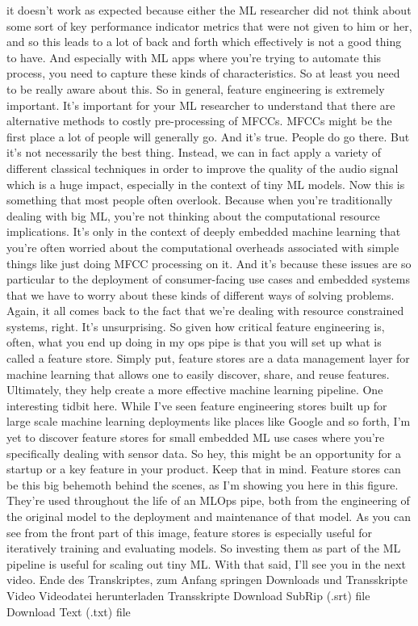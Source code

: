     it doesn't work as expected because either the ML researcher did not
    think about some sort of key performance indicator metrics
    that were not given to him or her, and so this
    leads to a lot of back and forth which effectively is not a good thing
    to have.
    And especially with ML apps where you're trying to automate this process,
    you need to capture these kinds of characteristics.
    So at least you need to be really aware about this.
    So in general, feature engineering is extremely important.
    It's important for your ML researcher to understand
    that there are alternative methods to costly pre-processing of MFCCs.
    MFCCs might be the first place a lot of people will generally go.
    And it's true.
    People do go there.
    But it's not necessarily the best thing.
    Instead, we can in fact apply a variety of different classical techniques
    in order to improve the quality of the audio signal which
    is a huge impact, especially in the context of tiny ML models.
    Now this is something that most people often overlook.
    Because when you're traditionally dealing with big ML,
    you're not thinking about the computational resource implications.
    It's only in the context of deeply embedded machine
    learning that you're often worried about the computational overheads associated
    with simple things like just doing MFCC processing on it.
    And it's because these issues are so particular to the deployment
    of consumer-facing use cases and embedded systems
    that we have to worry about these kinds of different ways of solving problems.
    Again, it all comes back to the fact that we're
    dealing with resource constrained systems, right.
    It's unsurprising.
    So given how critical feature engineering is, often, what you end up
    doing in my ops pipe is that you will set up what is called a feature store.
    Simply put, feature stores are a data management layer for machine learning
    that allows one to easily discover, share, and reuse features.
    Ultimately, they help create a more effective machine learning pipeline.
    One interesting tidbit here.
    While I've seen feature engineering stores built up
    for large scale machine learning deployments like places like Google
    and so forth, I'm yet to discover feature stores for small embedded ML
    use cases where you're specifically dealing with sensor data.
    So hey, this might be an opportunity for a startup
    or a key feature in your product.
    Keep that in mind.
    Feature stores can be this big behemoth behind the scenes,
    as I'm showing you here in this figure.
    They're used throughout the life of an MLOps pipe,
    both from the engineering of the original model
    to the deployment and maintenance of that model.
    As you can see from the front part of this image,
    feature stores is especially useful for iteratively training and evaluating
    models.
    So investing them as part of the ML pipeline is useful for scaling
    out tiny ML.
    With that said, I'll see you in the next video.
    Ende des Transkriptes, zum Anfang springen
    Downloads und Transskripte
    Video
    Videodatei herunterladen
    Transskripte
    Download SubRip (.srt) file
    Download Text (.txt) file    
   
